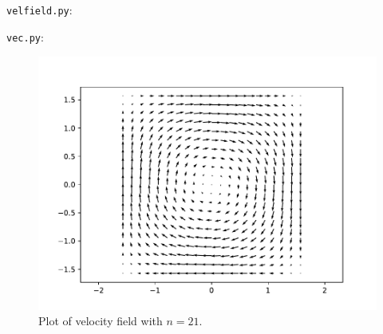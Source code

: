 \documentclass[a4paper,10pt,english]{article}
\begin{document}
\subsection{}
\verb|velfield.py|:

\verb|vec.py|:


\begin{figure}[h]
    \centering
    \includegraphics[scale=.7]{figures/figure_4_b.pdf}
    \caption{Plot of velocity field with $n=21$.}
    \label{fig:figure_4_b}
\end{figure}
\end{document}
